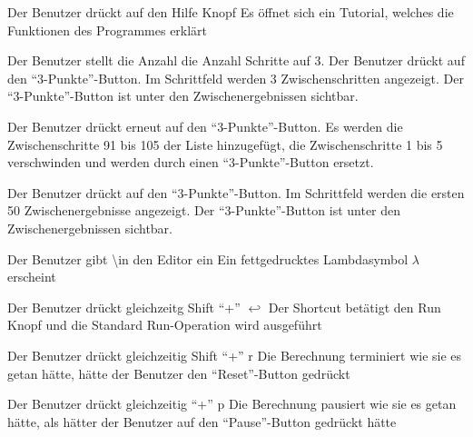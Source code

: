 \documentclass[parskip=full,11pt,twoside]{scrartcl}
\begin{document}
{Der Benutzer drückt auf den Hilfe Knopf}
{Es öffnet sich ein Tutorial, welches die Funktionen des Programmes erklärt}


{Der Benutzer stellt die Anzahl die Anzahl Schritte auf 3. Der Benutzer drückt auf den \enquote {3-Punkte}-Button.}
{Im Schrittfeld werden 3 Zwischenschritten angezeigt. Der \enquote {3-Punkte}-Button ist unter den Zwischenergebnissen sichtbar.}

{Der Benutzer drückt erneut auf den \enquote {3-Punkte}-Button.}
{Es werden die Zwischenschritte 91 bis 105 der Liste hinzugefügt, die Zwischenschritte 1 bis 5 verschwinden und werden durch einen \enquote {3-Punkte}-Button ersetzt.}

{Der Benutzer drückt auf den \enquote {3-Punkte}-Button.}
{Im Schrittfeld werden die ersten 50 Zwischenergebnisse angezeigt. Der \enquote {3-Punkte}-Button ist unter den Zwischenergebnissen sichtbar.}


{Der Benutzer gibt \textbackslash in den Editor ein}
{Ein fettgedrucktes Lambdasymbol $\lambda$ erscheint}

{Der Benutzer drückt gleichzeitg Shift \enquote {+} $\hookleftarrow$ }
{Der Shortcut betätigt den Run Knopf und die Standard Run-Operation wird ausgeführt}

{Der Benutzer drückt gleichzeitig Shift \enquote {+} r }
{Die Berechnung terminiert wie sie es getan hätte, hätte der Benutzer den \enquote{Reset}-Button gedrückt}

{Der Benutzer drückt gleichzeitig \enquote {+} p }
{Die Berechnung pausiert wie sie es getan hätte, als hätter der Benutzer auf den \enquote{Pause}-Button gedrückt hätte}
\end{document}
